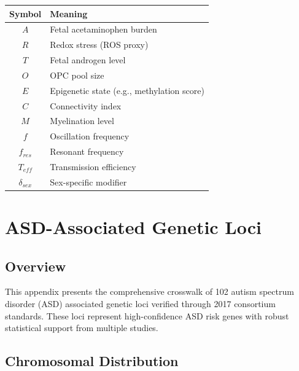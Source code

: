 \documentclass[12pt]{article}
\begin{document}
\begin{table}[h]
\centering
\begin{tabular}{cl}
\toprule
\textbf{Symbol} & \textbf{Meaning} \\
\midrule
$A$ & Fetal acetaminophen burden \\
$R$ & Redox stress (ROS proxy) \\
$T$ & Fetal androgen level \\
$O$ & OPC pool size \\
$E$ & Epigenetic state (e.g., methylation score) \\
$C$ & Connectivity index \\
$M$ & Myelination level \\
$f$ & Oscillation frequency \\
$f_{res}$ & Resonant frequency \\
$T_{eff}$ & Transmission efficiency \\
$\delta_{sex}$ & Sex-specific modifier \\
\bottomrule
\end{tabular}
\end{table}

\section{ASD-Associated Genetic Loci}

\subsection{Overview}
This appendix presents the comprehensive crosswalk of 102 autism spectrum disorder (ASD) associated genetic loci verified through 2017 consortium standards. These loci represent high-confidence ASD risk genes with robust statistical support from multiple studies.

\subsection{Chromosomal Distribution}
\end{document}
